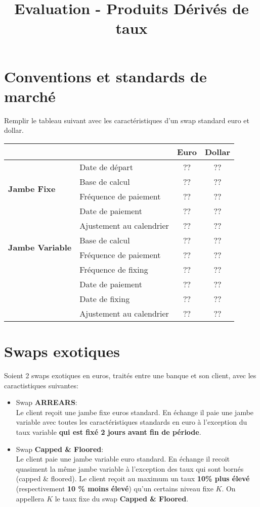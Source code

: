 \documentclass{article}
\begin{document}
\title{Evaluation - Produits Dérivés de taux}
\date{}
\maketitle
\section*{Conventions et standards de marché}
Remplir le tableau suivant avec les caractéristiques d'un swap standard euro et dollar.
\begin{center}
\begin{tabular}{|l|l|c|c|}
\hline
&&\textbf{Euro}&\textbf{Dollar}\\
\hline
&Date de départ&??&??\\
\hline
\multirow{2}{*}{\textbf{Jambe Fixe}}&Base de calcul&??&??\\
&Fréquence de paiement&??&??\\
&Date de paiement&??&??\\
&Ajustement au calendrier&??&??\\
\hline
\multirow{2}{*}{\textbf{Jambe Variable}}&Base de calcul&??&??\\
&Fréquence de paiement&??&??\\
&Fréquence de fixing&??&??\\
&Date de paiement&??&??\\
&Date de fixing&??&??\\ 
&Ajustement au calendrier&??&??\\
\hline
\end{tabular}
\end{center}

\section*{Swaps exotiques}
Soient 2 swaps exotiques en euros, traités entre une banque et son client, avec les caractistiques suivantes:
\begin{itemize}
\item Swap \textbf{ARREARS}:\\
Le client reçoit une jambe fixe euros standard. En échange il paie une jambe variable avec toutes les caractéristiques standards en euro à l'exception du taux variable \textbf{qui est fixé 2 jours avant fin de période}.
\item Swap \textbf{Capped \& Floored}:\\
Le client paie une jambe variable euro standard. En échange il recoit quasiment la même jambe variable à l'exception des taux qui sont bornés (capped \& floored). Le client reçoit au maximum un taux \textbf{10\% plus élevé} (respectivement \textbf{10 \% moins élevé}) qu'un certains niveau fixe $K$. On appellera $K$ le taux fixe du swap \textbf{Capped \& Floored}. 
\end{itemize}
\end{document}
